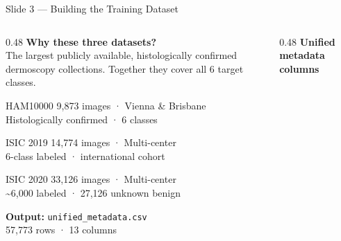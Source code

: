 \documentclass[aspectratio=169, 9pt]{beamer}
\begin{document}
\begin{frame}{Slide 3 --- Building the Training Dataset}

  \begin{columns}[T]

    \begin{column}{0.48\textwidth}
      \textbf{\color{navyblue}Why these three datasets?}\\[0.4em]
      The largest publicly available, histologically confirmed dermoscopy collections.
      Together they cover all 6 target classes.

      \vspace{0.6em}
      \begin{block}{HAM10000}
        \small 9,873 images · Vienna \& Brisbane\\
        Histologically confirmed · 6 classes
      \end{block}

      \vspace{0.3em}
      \begin{block}{ISIC 2019}
        \small 14,774 images · Multi-center\\
        6-class labeled · international cohort
      \end{block}

      \vspace{0.3em}
      \begin{block}{ISIC 2020}
        \small 33,126 images · Multi-center\\
        \textasciitilde6,000 labeled · 27,126 unknown benign
      \end{block}

      \vspace{0.5em}
      \textbf{Output:} \texttt{unified\_metadata.csv}\\
      {\small 57,773 rows · 13 columns}
    \end{column}

    \begin{column}{0.48\textwidth}
      \textbf{\color{navyblue}Unified metadata columns}


\end{column}
\end{columns}
\end{frame}
\end{document}
